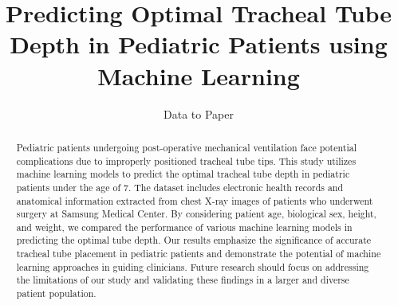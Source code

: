 \documentclass[11pt]{article}
\title{Predicting Optimal Tracheal Tube Depth in Pediatric Patients using Machine Learning}
\author{Data to Paper}
\begin{document}
\maketitle
\begin{abstract}
Pediatric patients undergoing post-operative mechanical ventilation face potential complications due to improperly positioned tracheal tube tips. This study utilizes machine learning models to predict the optimal tracheal tube depth in pediatric patients under the age of 7. The dataset includes electronic health records and anatomical information extracted from chest X-ray images of patients who underwent surgery at Samsung Medical Center. By considering patient age, biological sex, height, and weight, we compared the performance of various machine learning models in predicting the optimal tube depth. Our results emphasize the significance of accurate tracheal tube placement in pediatric patients and demonstrate the potential of machine learning approaches in guiding clinicians. Future research should focus on addressing the limitations of our study and validating these findings in a larger and diverse patient population.
\end{abstract}
\end{document}
